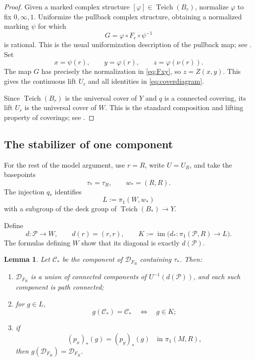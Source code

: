 \documentclass[11pt]{article}
\newcommand{\Teich}{\operatorname{Teich}}
\newcommand{\Def}{\mathcal D}
\newcommand{\Par}{\mathcal P}
\newcommand{\im}{\operatorname{im}}
\newtheorem{lemma}[theorem]{Lemma}
\theoremstyle{definition}
\theoremstyle{remark}
\begin{document}
\begin{proof}
Given a marked complex structure $[\varphi]\in\Teich(B_r)$, normalize
$\varphi$ to fix $0,\infty,1$.  Uniformize the pullback complex
structure, obtaining a normalized marking $\psi$ for which
\[
G=\varphi\circ F_r\circ\psi^{-1}
\]
is rational.  This is the usual uniformization description of the
pullback map; see \cite[Sections~2.1--2.2, Proposition~2.1]{HK}.
Set
\[
x=\psi(r),\qquad y=\varphi(r),\qquad z=\varphi(\nu(r)).
\]
The map $G$ has precisely the normalization in \eqref{eq:Fxy}, so
$z=Z(x,y)$.  This gives the continuous lift $U_r$ and all identities
in \eqref{eq:coverdiagram}.

Since $\Teich(B_r)$ is the universal cover of $Y$ and $q$ is a
connected covering, its lift $U_r$ is the universal cover of $W$.
This is the standard composition and lifting property of coverings;
see \cite[Section~1.3]{H}.
\end{proof}

\subsection{The stabilizer of one component}

For the rest of the model argument, use $r=R$, write $U=U_R$, and
take the basepoints
\[
\tau_*=\tau_R,\qquad w_*=(R,R).
\]
The injection $q_*$ identifies
\[
L:=\pi_1(W,w_*)
\]
with a subgroup of the deck group of $\Teich(B_*)\to Y$.

Define
\[
d:\Par\longrightarrow W,\qquad d(r)=(r,r),
\qquad
K:=\im\bigl(d_*:\pi_1(\Par,R)\to L\bigr).
\]
The formulas defining $W$ show that its diagonal is exactly
$d(\Par)$.

\begin{lemma}\label{lem:stabilizer}
Let $\mathcal C_*$ be the component of $\Def_{F_R}$ containing
$\tau_*$.  Then:
\begin{enumerate}
\item $\Def_{F_R}$ is a union of connected components of
$U^{-1}(d(\Par))$, and each such component is path connected;
\item for $g\in L$,
\[
g(\mathcal C_*)=\mathcal C_*
\quad\Longleftrightarrow\quad g\in K;
\]
\item if
\[
(p_x)_*(g)=(p_y)_*(g)
\quad\text{in }\pi_1(M,R),
\]
then $g(\Def_{F_R})=\Def_{F_R}$.
\end{enumerate}
\end{lemma}
\end{document}
